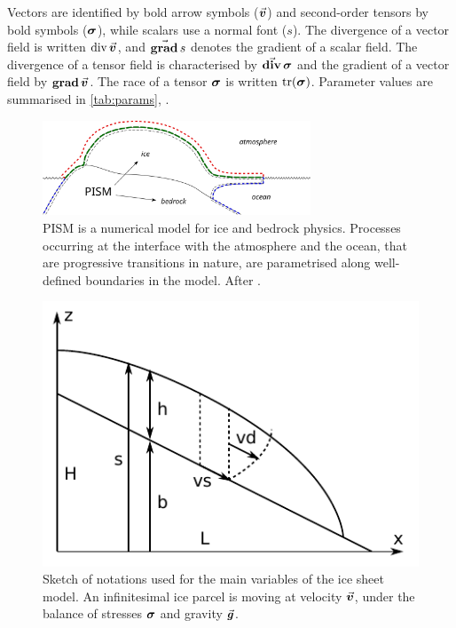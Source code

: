 \documentclass[a4paper]{kappa}
\newcommand{\vect}[1]{\va*{#1}} %
\newcommand{\tens}[1]{\vb*{#1}} %
\renewcommand{\div}[1]{\mathrm{div}\,#1}            %
\renewcommand{\grad}[1]{\vect{\mathrm{grad}}\,#1}   %
\newcommand{\tdiv}[1]{\vect{\mathrm{div}}\,#1}      %
\newcommand{\tgrad}[1]{\tens{\mathrm{grad}}\,#1}    %
\newcommand{\CST}[0]{\tens{\sigma}}     %
\newcommand{\vv}[0]{\vect{v}}           %
\begin{document}
Vectors are identified by bold arrow symbols ($\vv$) and second-order tensors
by bold symbols ($\CST$), while scalars use a normal font ($s$). The divergence
of a vector field is written $\div{\vv}$, and $\grad{s}$ denotes the gradient
of a scalar field. The divergence of a tensor field is characterised by
$\tdiv{\CST}$ and the gradient of a vector field by $\tgrad{\vv}$. The race of
a tensor $\CST$ is written $\tr(\CST)$. Parameter values are summarised in
\cref{tab:params}, .

\begin{figure}
  \includegraphics[width=80mm]{model-interfaces}
  \caption{PISM is a numerical model for ice and bedrock physics. Processes
           occurring at the interface with the atmosphere and the ocean, that
           are progressive transitions in nature, are parametrised along
           well-defined boundaries in the model.
           After \citet{PISM-authors.2014}.}
  \label{fig:model-interfaces}
\end{figure}

\begin{figure}
  \includegraphics{model-variables}
  \caption{Sketch of notations used for the main variables of the ice sheet
           model. An infinitesimal ice parcel is moving at velocity $\vv$,
           under the balance of stresses $\CST$ and gravity $\vect{g}$.}
  \label{fig:model-variables}
\end{figure}
\end{document}
